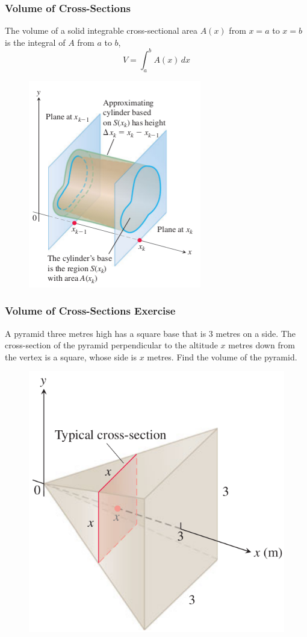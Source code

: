 \documentclass[xcolor=dvipsnames]{beamer}
\begin{document}
\begin{frame}
  \frametitle{Volume of Cross-Sections}
  The volume of a solid integrable cross-sectional area $A(x)$ from
  $x=a$ to $x=b$ is the integral of $A$ from $a$ to $b$,
  \begin{equation}
    \label{eq:upiecait}
    V=\int_{a}^{b}A(x)\,dx
  \end{equation}
  \begin{figure}[h]
    \includegraphics[scale=0.45]{./diagrams/crosssec.png}
  \end{figure}
\end{frame}

\begin{frame}
  \frametitle{Volume of Cross-Sections Exercise}
{\ubung} A pyramid three metres high has a square base that is 3
metres on a side. The cross-section of the pyramid perpendicular to
the altitude $x$ metres down from the vertex is a square, whose side is
$x$ metres. Find the volume of the pyramid.
\begin{figure}[h]
  \includegraphics[scale=0.3]{./diagrams/pyramidvol.png}
\end{figure}
\end{frame}
\end{document}
